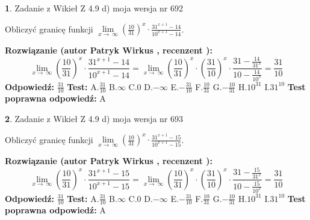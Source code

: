 \documentclass[12pt, a4paper]{article}
\theoremstyle{definition} %
\newtheorem{zad}{}
\newcommand{\zadStart}[1]{\begin{zad}#1\newline}
\newcommand{\zadStop}{\end{zad}}
\newcommand{\rozwStart}[2]{\noindent \textbf{Rozwiązanie (autor #1 , recenzent #2): }\newline}
\newcommand{\rozwStop}{\newline}
\newcommand{\odpStart}{\noindent \textbf{Odpowiedź:}\newline}
\newcommand{\odpStop}{\newline}
\newcommand{\testStart}{\noindent \textbf{Test:}\newline}
\newcommand{\testStop}{\newline}
\newcommand{\kluczStart}{\noindent \textbf{Test poprawna odpowiedź:}\newline}
\newcommand{\kluczStop}{\newline}
\begin{document}
\zadStart{Zadanie z Wikieł Z 4.9 d) moja wersja nr 692}


Obliczyć granicę funkcji  $\lim\limits_{x\to\ \infty}(\frac{10}{31})^{x}\cdot\frac{31^{x+1}-14}{10^{x+1}-14}$.
\zadStop
\rozwStart{Patryk Wirkus}{}
$$\lim\limits_{x\to\ \infty}(\frac{10}{31})^{x}\cdot\frac{31^{x+1}-14}{10^{x+1}-14}=\lim\limits_{x\to\ \infty}(\frac{10}{31})^{x}\cdot(\frac{31}{10})^{x} \cdot \frac{31-\frac{14}{31^{x}}}{10-\frac{14}{10^{x}}} = \frac{31}{10}$$
\rozwStop
\odpStart
$\frac{31}{10}$
\odpStop
\testStart
A.$\frac{31}{10}$ B.$\infty$ C.$0$ D.$-\infty$ E.$-\frac{31}{10}$
F.$\frac{10}{31}$ G.$-\frac{10}{31}$
H.$10^{31}$
I.$31^{10}$
\testStop
\kluczStart
A
\kluczStop



\zadStart{Zadanie z Wikieł Z 4.9 d) moja wersja nr 693}


Obliczyć granicę funkcji  $\lim\limits_{x\to\ \infty}(\frac{10}{31})^{x}\cdot\frac{31^{x+1}-15}{10^{x+1}-15}$.
\zadStop
\rozwStart{Patryk Wirkus}{}
$$\lim\limits_{x\to\ \infty}(\frac{10}{31})^{x}\cdot\frac{31^{x+1}-15}{10^{x+1}-15}=\lim\limits_{x\to\ \infty}(\frac{10}{31})^{x}\cdot(\frac{31}{10})^{x} \cdot \frac{31-\frac{15}{31^{x}}}{10-\frac{15}{10^{x}}} = \frac{31}{10}$$
\rozwStop
\odpStart
$\frac{31}{10}$
\odpStop
\testStart
A.$\frac{31}{10}$ B.$\infty$ C.$0$ D.$-\infty$ E.$-\frac{31}{10}$
F.$\frac{10}{31}$ G.$-\frac{10}{31}$
H.$10^{31}$
I.$31^{10}$
\testStop
\kluczStart
A
\kluczStop
\end{document}
